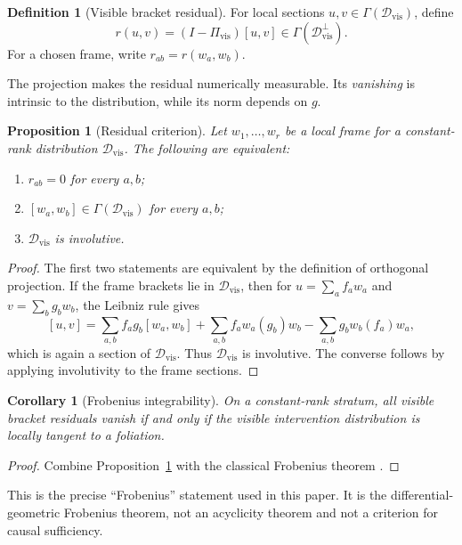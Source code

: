 \documentclass{article}
\theoremstyle{plain}
\newtheorem{proposition}[theorem]{Proposition}
\newtheorem{corollary}[theorem]{Corollary}
\theoremstyle{definition}
\newtheorem{definition}[theorem]{Definition}
\theoremstyle{remark}
\newcommand{\Dvis}{\mathcal D_{\mathrm{vis}}}
\newcommand{\Pvis}{\Pi_{\mathrm{vis}}}
\begin{document}
\begin{definition}[Visible bracket residual]
For local sections \(u,v\in\Gamma(\Dvis)\), define
\[
  r(u,v)
  =
  (I-\Pvis)[u,v]\in\Gamma(\Dvis^\perp).
\]
For a chosen frame, write \(r_{ab}=r(w_a,w_b)\).
\end{definition}

The projection makes the residual numerically measurable.  Its \emph{vanishing}
is intrinsic to the distribution, while its norm depends on \(g\).

\begin{proposition}[Residual criterion]
\label{prop:residual-criterion}
Let \(w_1,\ldots,w_r\) be a local frame for a constant-rank distribution
\(\Dvis\).  The following are equivalent:
\begin{enumerate}[label=(\roman*),itemsep=1pt]
  \item \(r_{ab}=0\) for every \(a,b\);
  \item \([w_a,w_b]\in\Gamma(\Dvis)\) for every \(a,b\);
  \item \(\Dvis\) is involutive.
\end{enumerate}
\end{proposition}

\begin{proof}
The first two statements are equivalent by the definition of orthogonal
projection.  If the frame brackets lie in \(\Dvis\), then for
\(u=\sum_a f_aw_a\) and \(v=\sum_b g_bw_b\), the Leibniz rule gives
\[
 [u,v]
 =
 \sum_{a,b}f_ag_b[w_a,w_b]
 +\sum_{a,b}f_aw_a(g_b)w_b
 -\sum_{a,b}g_bw_b(f_a)w_a,
\]
which is again a section of \(\Dvis\).  Thus \(\Dvis\) is involutive.  The
converse follows by applying involutivity to the frame sections.
\end{proof}

\begin{corollary}[Frobenius integrability]
\label{cor:frobenius}
On a constant-rank stratum, all visible bracket residuals vanish if and only if
the visible intervention distribution is locally tangent to a foliation.
\end{corollary}

\begin{proof}
Combine Proposition~\ref{prop:residual-criterion} with the classical Frobenius theorem
\citep{lee2012smooth}.
\end{proof}

This is the precise ``Frobenius'' statement used in this paper.  It is the
differential-geometric Frobenius theorem, not an acyclicity theorem and not a
criterion for causal sufficiency.
\end{document}
